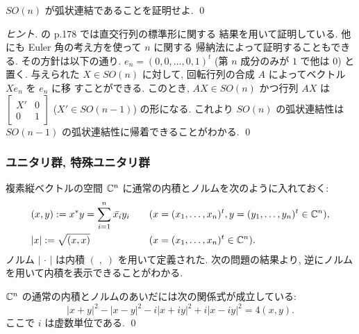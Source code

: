 \documentclass[12pt,twoside]{jarticle}
\begin{document}

\begin{question}[30点]
  $SO(n)$ が弧状連結であることを証明せよ. \qed
\end{question}

\begin{proof}[ヒント]
\cite{satake} の p.178 では直交行列の標準形に関する
結果を用いて証明している. 他にも Euler 角の考え方を使って $n$ に関する
帰納法によって証明することもできる. その方針は以下の通り. %
$e_n = (0,0,\dots,0,1)^t$ (第 $n$ 成分のみが $1$ で他は $0$)
と置く. 与えられた $X\in SO(n)$ に対して,
回転行列の合成 $A$ によってベクトル $X e_n$ を $e_n$ に移
すことができる. このとき, $AX \in SO(n)$ かつ行列 $AX$ は %
\( \begin{bmatrix}X'&0\\0&1\end{bmatrix} \) %
($X' \in SO(n-1)$) の形になる. これより $SO(n)$ の弧状連結性は %
$SO(n-1)$ の弧状連結性に帰着できることがわかる.
\qed
\end{proof}


\subsubsection{ユニタリ群, 特殊ユニタリ群}


複素縦ベクトルの空間 ${\mathbb C}^n$ に通常の内積とノルムを次のように入れておく:
\begin{alignat*}{2}
 &
 (x,y) := x^*y = \sum_{i=1}^n \bar{x_i} y_i 
 & &
 \quad (x=(x_1,\dots,x_n)^t, y=(y_1,\dots,y_n)^t\in{\mathbb C}^n),
 \\ &
 |x| := \sqrt{(x,x)} 
 & &
 \quad (x=(x_1,\dots,x_n)^t\in{\mathbb C}^n).
\end{alignat*}
ノルム $|\,\cdot\,|$ は内積 $(\;,\;)$ を用いて定義された.
次の問題の結果より, 逆にノルムを用いて内積を表示できることがわかる.

\begin{question}[5点]
 ${\mathbb C}^n$ の通常の内積とノルムのあいだには次の関係式が成立している:
 \begin{equation*}
  |x+y|^2 - |x-y|^2 - i |x+iy|^2 + i |x-iy|^2 = 4(x,y).
 \end{equation*}
 ここで $i$ は虚数単位である.
 \qed
\end{question}
\end{document}

